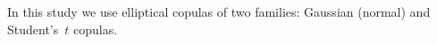 \documentclass{llncs}
\begin{document}
In this study we use elliptical copulas of two families: Gaussian (normal) and Student's~$t$ copulas.
%
%
\end{document}

